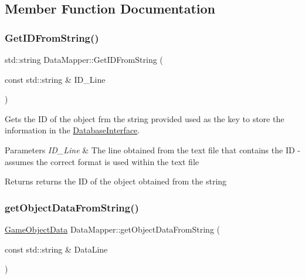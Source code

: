 \subsection{Member Function Documentation}
\mbox{\label{class_data_mapper_a46e3c795a3ec96a58dd1006079b0938d}} 
\subsubsection{\texorpdfstring{Get\+I\+D\+From\+String()}{GetIDFromString()}}
{\footnotesize\ttfamily std\+::string Data\+Mapper\+::\+Get\+I\+D\+From\+String (\begin{DoxyParamCaption}\item[{const std\+::string \&}]{I\+D\+\_\+\+Line }\end{DoxyParamCaption})\hspace{0.3cm}{\ttfamily [private]}}



Gets the ID of the object frm the string provided used as the key to store the information in the \hyperlink{class_database_interface}{Database\+Interface}. 


\begin{DoxyParams}{Parameters}
{\em I\+D\+\_\+\+Line} & The line obtained from the text file that contains the ID -\/ assumes the correct format is used within the text file \\
\hline
\end{DoxyParams}
\begin{DoxyReturn}{Returns}
returns the ID of the object obtained from the string 
\end{DoxyReturn}
\mbox{\label{class_data_mapper_a69d2e0ba874a2e3b0dd9752c1c72db34}} 
\subsubsection{\texorpdfstring{get\+Object\+Data\+From\+String()}{getObjectDataFromString()}}
{\footnotesize\ttfamily \hyperlink{struct_game_object_data}{Game\+Object\+Data} Data\+Mapper\+::get\+Object\+Data\+From\+String (\begin{DoxyParamCaption}\item[{const std\+::string \&}]{Data\+Line }\end{DoxyParamCaption})\hspace{0.3cm}{\ttfamily [private]}}




